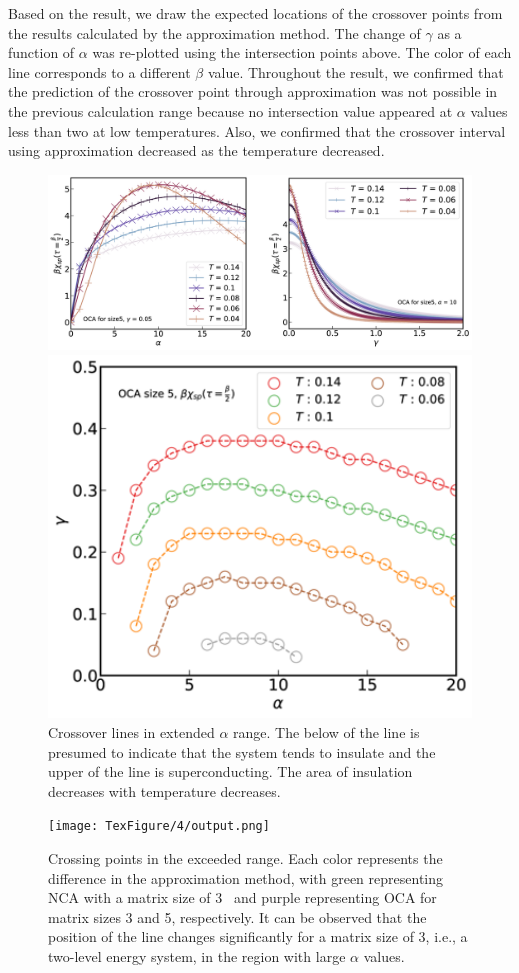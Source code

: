 \documentclass{article}
\begin{document}
\begin{spacing}{1.3}
Based on the result, we draw the expected locations of the crossover points from the results calculated by the approximation method. 
The change of $\gamma$ as a function of $\alpha$ was re-plotted using the intersection points above. 
The color of each line corresponds to a different $\beta$ value.
Throughout the result, we confirmed that the prediction of the crossover point through approximation was not possible 
in the previous calculation range because no intersection value appeared at $\alpha$ values less than two at low temperatures. 
Also, we confirmed that the crossover interval using approximation decreased as the temperature decreased.
\pagebreak
\begin{figure}[H]
  \vfill
  \centerline{\includegraphics[width=12cm]{TexFigure/4/4_4_04_crossing.png}}
  \centerline{\includegraphics[width=12cm]{TexFigure/4/4_4_05_templine.png}}
  \caption{Crossover lines in extended $\alpha$ range. The below of the line is presumed to indicate that the system tends to insulate and the upper of the line is superconducting. The area of insulation decreases with temperature decreases.}
\vfill
\end{figure}
\pagebreak
\newpage
\begin{figure}[H]
  \centerline{\texttt{[image: TexFigure/4/output.png]}}
  \caption{Crossing points in the exceeded range. Each color represents the difference in the approximation method, 
  with green representing NCA with a matrix size of 3  and purple representing OCA for matrix sizes 3 and 5, respectively. 
  It can be observed that the position of the line changes significantly for a matrix size of 3, i.e., a two-level energy system, 
  in the region with large $\alpha$ values.}
 \end{figure}
\end{spacing}
\end{document}
